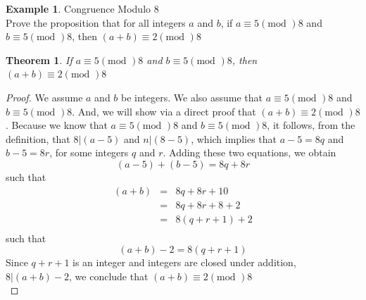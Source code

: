 \documentclass{book}
\newtheorem{theorem}{Theorem}[section]
\theoremstyle{definition}
\newtheorem{example}{Example}[definition]
\theoremstyle{remark}
\begin{document}
\begin{example}
Congruence Modulo 8 \cite[Chap.3, P.C.3.4, Q.4]{ted} \\

Prove the proposition that for all integers $a$ and $b$, if $a \equiv 5 (\text{mod }) 8$ and $b \equiv 5 (\text{mod }) 8$, then $(a+b) \equiv 2 (\text{mod }) 8$ \\

\begin{tcolorbox}
	\begin{theorem}
		If $a \equiv 5 (\text{mod })8$ and $b \equiv 5 (\text{mod })8$, then $(a + b) \equiv 2 (\text{mod })8$
	\end{theorem}
\end{tcolorbox}

\begin{proof}
    We assume $a$ and $b$ be integers. We also assume that $a \equiv 5 (\text{mod })8$ and $b \equiv 5 (\text{mod })8$. And, we will show via a direct proof that $(a + b) \equiv 2 (\text{mod })8$. Because we know that $a \equiv 5 (\text{mod })8$ and $b \equiv 5 (\text{mod })8$, it follows, from the definition, that   $8 | (a-5)$ and $n | (8-5)$, which implies that $a-5 = 8q$ and $b-5 = 8r$, for some integers $q$ and $r$. Adding these two equations, we obtain \[ (a-5) + (b-5) = 8q + 8r \]such that
    	\begin{eqnarray}
    	(a+b)& = & 8q + 8r + 10 \nonumber \\
    	& = & 8q + 8r + 8 + 2 \nonumber \\
    	& = & 8(q + r + 1) + 2 \nonumber \\
    	\end{eqnarray}	 
    such that \[ (a+b) - 2 = 8(q + r + 1) \] 
    Since $q + r + 1$ is an integer and integers are closed under addition, $8 | (a+b) - 2$, we conclude that $(a+b) \equiv 2 (\text{mod })8$ \\
\end{proof}
\end{example}
\end{document}
